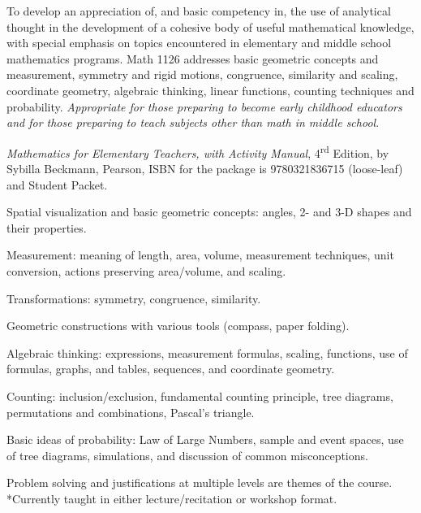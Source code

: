 \documentclass{osucourse}
\begin{document}
\CatalogDescription
\PrerequisitesAndExclusions

\begin{Purpose}
To develop an appreciation of, and basic competency in, the use of analytical thought in the development of a cohesive body of useful mathematical knowledge, with special emphasis on topics encountered in elementary and middle school mathematics programs. Math 1126 addresses basic geometric concepts and measurement, symmetry and rigid motions, congruence, similarity and scaling, coordinate geometry, algebraic thinking, linear functions, counting techniques and probability. \emph{Appropriate for those preparing to become early childhood educators and for those preparing to teach subjects other than math in middle school}.
\end{Purpose}

\begin{Text}
\emph{Mathematics for Elementary Teachers, with Activity Manual}, 4\textsuperscript{rd} Edition, by Sybilla Beckmann, Pearson, ISBN for the package is 9780321836715 (loose-leaf) and Student Packet.
\end{Text}

\begin{TopicsList}
\item Spatial visualization and basic geometric concepts: angles, 2- and 3-D shapes and their properties.
\item Measurement: meaning of length, area, volume, measurement techniques, unit conversion, actions preserving area/volume, and scaling.
\item Transformations: symmetry, congruence, similarity.
\item Geometric constructions with various tools (compass, paper folding).
\item Algebraic thinking: expressions, measurement formulas, scaling, functions, use of formulas, graphs, and tables, sequences, and coordinate geometry.
\item Counting: inclusion/exclusion, fundamental counting principle, tree diagrams, permutations and combinations, Pascal’s triangle.
\item Basic ideas of probability: Law of Large Numbers, sample and event spaces, use of tree diagrams, simulations, and discussion of common misconceptions.
\item Problem solving and justifications at multiple levels are themes of the course. *Currently taught in either lecture/recitation or workshop format.
\end{TopicsList}
\end{document}
